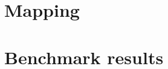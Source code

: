 \documentclass{eplmastersthesis}
\begin{document}
\chapter{Mapping}


%

%


\appendix
\chapter{Benchmark results}


\backcoverpage
\end{document}
